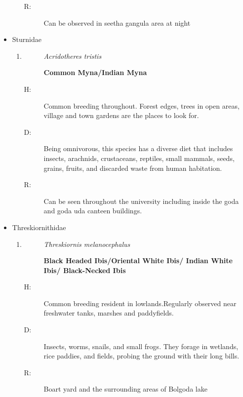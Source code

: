 \begin{itemize}
\begin{enumerate}
\begin{description}
\item[R: ]%
Can be observed in seetha gangula area at night%
\end{description}%
\end{enumerate}%
\item%
Sturnidae%
\begin{enumerate}%
\item%
\begin{description}%
\item[]%
\textit{Acridotheres tristis}%
\item[]%
\textbf{Common Myna/Indian Myna}%
\end{description}%
\begin{description}%
\item[H: ]%
Common breeding throughout. Forest edges, trees in open areas, village and town gardens are the places to look for. %
\item[D: ]%
Being omnivorous, this species has a diverse diet that includes insects, arachnids, crustaceans, reptiles, small mammals, seeds, grains, fruits, and discarded waste from human habitation.%
\item[R: ]%
Can be seen throughout the university including inside the goda and goda uda canteen buildings.%
\end{description}%
\end{enumerate}%
\item%
Threskiornithidae%
\begin{enumerate}%
\item%
\begin{description}%
\item[]%
\textit{Threskiornis melanocephalus}%
\item[]%
\textbf{Black Headed Ibis/Oriental White Ibis/ Indian White Ibis/ Black{-}Necked Ibis}%
\end{description}%
\begin{description}%
\item[H: ]%
Common breeding resident in lowlands.Regularly observed near freshwater tanks, marshes and paddyfields.%
\item[D: ]%
Insects, worms, snails, and small frogs. They forage in wetlands, rice paddies, and fields, probing the ground with their long bills.%
\item[R: ]%
Boart yard and the surrounding areas of Bolgoda lake%
\end{description}%
\end{enumerate}%
\end{itemize}